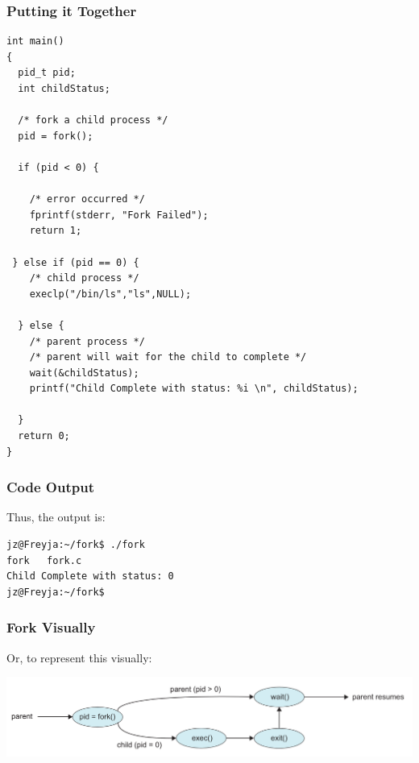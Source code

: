 \begin{frame}[fragile]
\frametitle{Putting it Together}

{\scriptsize
\begin{verbatim}
int main()
{
  pid_t pid;
  int childStatus;

  /* fork a child process */
  pid = fork();
  
  if (pid < 0) { 
  
    /* error occurred */ 
    fprintf(stderr, "Fork Failed"); 
    return 1;
    
 } else if (pid == 0) { 
    /* child process */
    execlp("/bin/ls","ls",NULL);
    
  } else { 
    /* parent process */
    /* parent will wait for the child to complete */
    wait(&childStatus);
    printf("Child Complete with status: %i \n", childStatus);
    
  }
  return 0;
}
\end{verbatim}
}

\end{frame}

\begin{frame}[fragile]
\frametitle{Code Output}

Thus, the output is:
\begin{verbatim}
jz@Freyja:~/fork$ ./fork 
fork   fork.c
Child Complete with status: 0
jz@Freyja:~/fork$ 
\end{verbatim}


\end{frame}

\begin{frame}
\frametitle{Fork Visually}

Or, to represent this visually:

\begin{center}
\includegraphics[width=\textwidth]{images/fork-syscall.png}
\end{center}

\end{frame}

